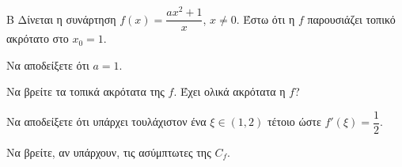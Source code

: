 \begin{thema}{Β}
Δίνεται η συνάρτηση $f(x) = \dfrac{ax^2+1}{x}$, $x\neq0$. Έστω ότι η $f$ παρουσιάζει τοπικό ακρότατο στο $x_0=1$.
\begin{erwthma}
  \item Να αποδείξετε ότι $a=1$.
  \item Να βρείτε τα τοπικά ακρότατα της $f$. Έχει ολικά ακρότατα η $f$?
  \item Να αποδείξετε ότι υπάρχει τουλάχιστον ένα $\xi \in (1, 2)$ τέτοιο ώστε $f'(\xi) = \dfrac{1}{2}$.
  \item Να βρείτε, αν υπάρχουν, τις ασύμπτωτες της $C_f$.
\end{erwthma}
\end{thema}
